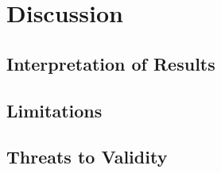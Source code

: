 \documentclass[../main.tex]{subfiles}
\begin{document}
\chapter{Discussion}
\label{ch:discussion}


\section{Interpretation of Results}
\label{sec:discussion-interpretation}

\section{Limitations}
\label{sec:discussion-limitations}

\section{Threats to Validity}
\label{sec:discussion-threats}
\end{document}
